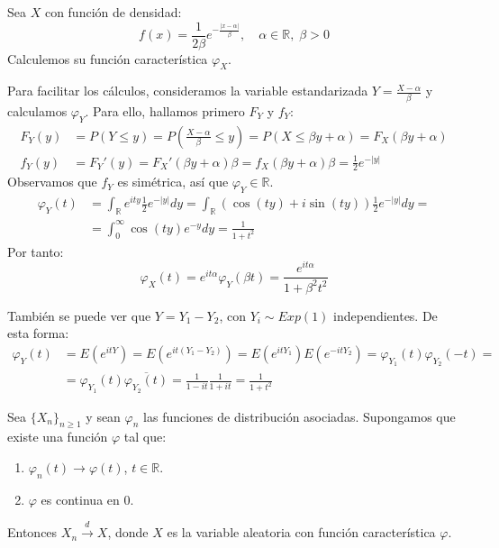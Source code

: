 \begin{exercise}
    Sea $X$ con función de densidad:
    $$f(x) = \frac{1}{2\beta}e^{-\frac{|x-\alpha|}{\beta}}, \quad \alpha \in \mathbb{R}, \; \beta > 0$$
    Calculemos su función característica $\varphi_X$.

    Para facilitar los cálculos, consideramos la variable estandarizada $Y = \frac{X-\alpha}{\beta}$ y calculamos $\varphi_Y$.
    Para ello, hallamos primero $F_Y$ y $f_Y$:
    \begin{align*}
        F_Y(y) & = P(Y \leq y) = P\left(\frac{X-\alpha}{\beta} \leq y\right) = P(X \leq \beta y + \alpha) = F_X(\beta y + \alpha) \\
        f_Y(y) & = F_Y'(y) = F_X'(\beta y + \alpha)\beta = f_X(\beta y + \alpha)\beta = \frac{1}{2}e^{-|y|}
    \end{align*}
    Observamos que $f_Y$ es simétrica, así que $\varphi_Y \in \mathbb{R}$.
    \begin{align*}
        \varphi_Y(t) & = \int_\mathbb{R} e^{ity}\frac{1}{2}e^{-|y|}dy = \int_\mathbb{R} (\cos(ty) + i\sin(ty))\frac{1}{2}e^{-|y|}dy = \\
                     & = \int_0^\infty \cos(ty)e^{-y}dy = \frac{1}{1+t^2}
    \end{align*}
    Por tanto:
    $$\varphi_X(t) = e^{it\alpha}\varphi_Y(\beta t) = \frac{e^{it\alpha}}{1+\beta^2t^2}$$

    También se puede ver que $Y = Y_1 - Y_2$, con $Y_i \sim Exp(1)$ independientes.
    De esta forma:
    \begin{align*}
        \varphi_Y(t) & = E(e^{itY}) = E(e^{it(Y_1-Y_2)}) = E(e^{itY_1})E(e^{-itY_2}) = \varphi_{Y_1}(t)\varphi_{Y_2}(-t) = \\
                     & = \varphi_{Y_1}(t) \overline{\varphi_{Y_2}(t)} = \frac{1}{1-it}\frac{1}{1+it} = \frac{1}{1+t^2}
    \end{align*}
\end{exercise}

\begin{theorem}
    Sea $\{X_n\}_{n \geq 1}$ y sean $\varphi_n$ las funciones de distribución asociadas.
    Supongamos que existe una función $\varphi$ tal que:
    \begin{enumerate}
        \item $\varphi_n(t) \to \varphi(t)$, $t \in \mathbb{R}$.
        \item $\varphi$ es continua en 0.
    \end{enumerate}
    Entonces $X_n \xrightarrow{d} X$, donde $X$ es la variable aleatoria con función característica $\varphi$.
\end{theorem}

